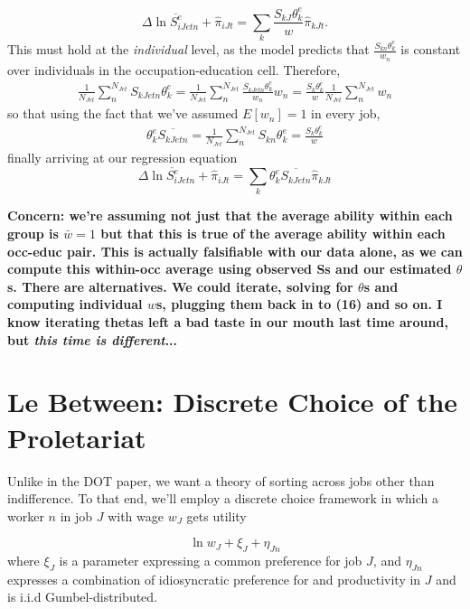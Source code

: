 \documentclass[12pt]{article}
\begin{document}
\begin{equation}
\Delta \overline{ \ln S^e_{iJetn}}+\hat{\pi}_{iJt}= \sum_k \frac{S_{kJ}\theta^e_k}{w} \hat{\pi}_{kJt}.
\end{equation}
This must hold at the \textit{individual} level, as the model predicts that $\frac{S_{kn}\theta^e_k}{w_n}$ is constant over individuals in the occupation-education cell. Therefore,
\begin{eqnarray}
\frac{1}{N_{Jet}}\sum_n^{N_{Jet}} S_{kJetn}\theta^e_k=
\frac{1}{N_{Jet}}\sum_n^{N_{Jet}} \frac{S_{kJetn}\theta^e_k}{w_n}w_n=
\frac{S_{k}\theta^e_k}{w}\frac{1}{N_{Jet}}\sum_n^{N_{Jet}} w_n
\end{eqnarray}
so that using the fact that we've assumed $E[w_n]=1$ in every job, 
\begin{eqnarray}
\theta_k^e \overline{S_{kJetn}}=\frac{1}{N_{Jet}}\sum_n^{N_{Jet}} S_{kn}\theta^e_k=\frac{S_{k}\theta^e_k}{w}
\end{eqnarray}
finally arriving at our regression equation
\begin{equation}
\Delta \overline{ \ln S^e_{iJetn}}+\hat{\pi}_{iJt}= \sum_k\theta_k^e \overline{S_{kJetn}}\hat{\pi}_{kJt}
\end{equation}

\textbf{Concern: we're assuming not just that the average ability within each group is $\bar{w}=1$ but that this
is true of the average ability within each occ-educ pair. This is actually falsifiable with our data alone, as we can
compute this within-occ average using observed Ss and our estimated $\theta$s. There are alternatives. We could iterate,
solving for $\theta$s and computing individual $w$s, plugging them back in to (16) and so on. I know iterating thetas left
a bad taste in our mouth last time around, but \textit{this time is different}...}

\section{Le Between: Discrete Choice of the Proletariat}

Unlike in the DOT paper, we want a theory of sorting across jobs other than indifference. To that end, we'll employ a discrete
choice framework in which a worker $n$ in job $J$ with wage $w_J$ gets utility

\begin{equation}
\ln w_J + \xi_J+\eta_{Jn}
\end{equation}
where $\xi_J$ is a parameter expressing a common preference for job $J$, and $\eta_{Jn}$ expresses a combination of idiosyncratic preference for and productivity in $J$ and is i.i.d Gumbel-distributed.
\end{document}
